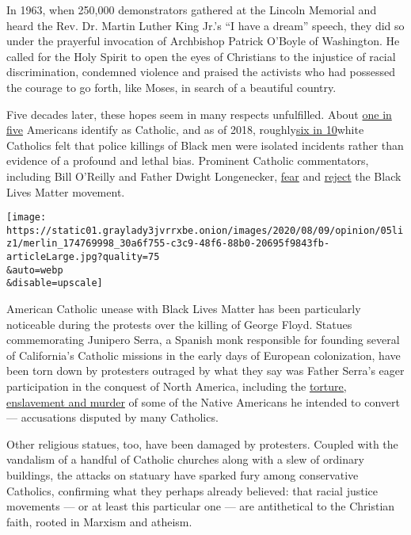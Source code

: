 In 1963, when 250,000 demonstrators gathered at the Lincoln Memorial and
heard the Rev. Dr. Martin Luther King Jr.'s ``I have a dream'' speech,
they did so under the prayerful invocation of Archbishop Patrick O'Boyle
of Washington. He called for the Holy Spirit to open the eyes of
Christians to the injustice of racial discrimination, condemned violence
and praised the activists who had possessed the courage to go forth,
like Moses, in search of a beautiful country.

Five decades later, these hopes seem in many respects unfulfilled. About
\href{https://www.pewforum.org/religious-landscape-study/}{one in five}
Americans identify as Catholic, and as of 2018,
roughly\href{https://www.prri.org/research/partisan-polarization-dominates-trump-era-findings-from-the-2018-american-values-survey/}{six
in 10}white Catholics felt that police killings of Black men were
isolated incidents rather than evidence of a profound and lethal bias.
Prominent Catholic commentators, including Bill O'Reilly and Father
Dwight Longenecker,
\href{https://www.billoreilly.com/b/Bills-Column-on-the-BLM-Organization:-Its-News-to-Us/-20554200728065000.html?dest=/mobile/blogdetail.jsp}{fear}
and
\href{https://www.crisismagazine.com/2020/blacks-lives-matter-but-so-does-the-truth}{reject}
the Black Lives Matter movement.

\texttt{[image: https://static01.graylady3jvrrxbe.onion/images/2020/08/09/opinion/05liz1/merlin\_174769998\_30a6f755-c3c9-48f6-88b0-20695f9843fb-articleLarge.jpg?quality=75\\\&auto=webp\\\&disable=upscale]}

American Catholic unease with Black Lives Matter has been particularly
noticeable during the protests over the killing of George Floyd. Statues
commemorating Junipero Serra, a Spanish monk responsible for founding
several of California's Catholic missions in the early days of European
colonization, have been torn down by protesters outraged by what they
say was Father Serra's eager participation in the conquest of North
America, including the
\href{https://www.nytimes3xbfgragh.onion/2015/09/30/us/attack-on-statue-of-new-saint-junipero-serra-digs-up-old-conflicts.html}{torture,
enslavement and murder} of some of the Native Americans he intended to
convert --- accusations disputed by many Catholics.

Other religious statues, too, have been damaged by protesters. Coupled
with the vandalism of a handful of Catholic churches along with a slew
of ordinary buildings, the attacks on statuary have sparked fury among
conservative Catholics, confirming what they perhaps already believed:
that racial justice movements --- or at least this particular one ---
are antithetical to the Christian faith, rooted in Marxism and atheism.


